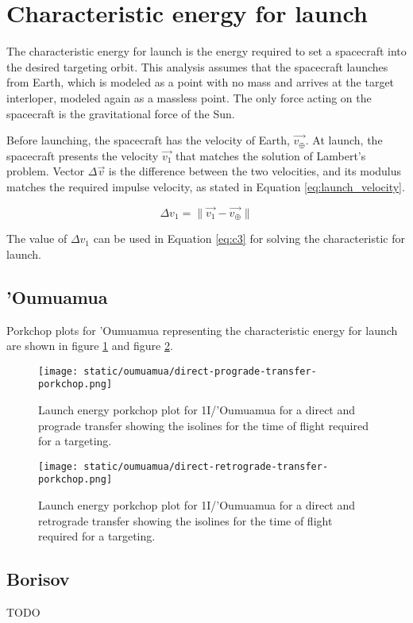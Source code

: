 \section{Characteristic energy for launch}

The characteristic energy for launch is the energy required to set a spacecraft
into the desired targeting orbit. This analysis assumes that the spacecraft
launches from Earth, which is modeled as a point with no mass and arrives at the
target interloper, modeled again as a massless point. The only force acting on
the spacecraft is the gravitational force of the Sun.

Before launching, the spacecraft has the velocity of Earth, $\vec{v_{\oplus}}$.
At launch, the spacecraft presents the velocity $\vec{v_1}$ that matches the
solution of Lambert's problem. Vector $\Delta{\vec{v}}$ is the difference
between the two velocities, and its modulus matches the required impulse
velocity, as stated in Equation \ref{eq:launch_velocity}.

\begin{equation}
    \Delta v_1 = \|\vec{v_1} - \vec{v_{\oplus}}\|
    \label{eq:launch_velocity}
\end{equation}

The value of $\Delta v_1$ can be used in Equation \ref{eq:c3} for solving the
characteristic for launch.

\subsection{'Oumuamua}

Porkchop plots for 'Oumuamua representing the characteristic energy for launch
are shown in figure \ref{fig:oumuamua-direct-prograde-transfer-porkchop} and
figure \ref{fig:oumuamua-direct-retrograde-transfer-porkchop}.

\begin{figure}[H]
  \centering
  \texttt{[image: static/oumuamua/direct-prograde-transfer-porkchop.png]}
        \caption[Direct and prograde launch energy porkchop for 'Oumuamua]{Launch energy porkchop plot for 1I/'Oumuamua for a direct and prograde
        transfer showing the isolines for
        the time of flight required for a targeting.}
  \label{fig:oumuamua-direct-prograde-transfer-porkchop}
\end{figure}

\begin{figure}[H]
  \centering
  \texttt{[image: static/oumuamua/direct-retrograde-transfer-porkchop.png]}
        \caption[Direct and retrograde launch energy porkchop for
        'Oumuamua]{Launch energy porkchop plot for 1I/'Oumuamua for a direct and
        retrograde transfer showing the isolines for
        the time of flight required for a targeting.}
  \label{fig:oumuamua-direct-retrograde-transfer-porkchop}
\end{figure}





\subsection{Borisov}

TODO
